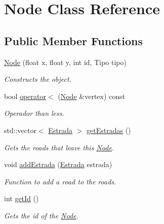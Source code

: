 \hypertarget{class_node}{}\section{Node Class Reference}
\label{class_node}
\subsection*{Public Member Functions}
\begin{DoxyCompactItemize}
\item 
\mbox{\hyperlink{class_node_aaa40669ceede2bdca5ed19df3ef0eb65}{Node}} (float x, float y, int id, Tipo tipo)
\begin{DoxyCompactList}\small\item\em Constructs the object. \end{DoxyCompactList}\item 
bool \mbox{\hyperlink{class_node_aa2521fef8b2cbf414a8b22a84baa196e}{operator$<$}} (\mbox{\hyperlink{class_node}{Node}} \&vertex) const
\begin{DoxyCompactList}\small\item\em Operador than less. \end{DoxyCompactList}\item 
std\+::vector$<$ \mbox{\hyperlink{class_estrada}{Estrada}} $>$ \mbox{\hyperlink{class_node_a8e76b1e655f7e4264fc461c03ad00d56}{get\+Estradas}} ()
\begin{DoxyCompactList}\small\item\em Gets the roads that leave this \mbox{\hyperlink{class_node}{Node}}. \end{DoxyCompactList}\item 
\mbox{\label{class_node_a48bb175e508bfc0b5632a6c4d866e454}} 
void \mbox{\hyperlink{class_node_a48bb175e508bfc0b5632a6c4d866e454}{add\+Estrada}} (\mbox{\hyperlink{class_estrada}{Estrada}} estrada)
\begin{DoxyCompactList}\small\item\em Function to add a road to the roads. \end{DoxyCompactList}\item 
int \mbox{\hyperlink{class_node_a3c7b8ccf4dab44216b997c5f63f11d9f}{get\+Id}} ()
\begin{DoxyCompactList}\small\item\em Gets the id of the \mbox{\hyperlink{class_node}{Node}}. \end{DoxyCompactList}\item 

\end{DoxyCompactItemize}
